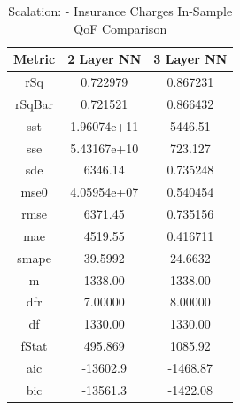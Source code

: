 \documentclass{article}
\begin{document}
\begin{table}[H]
\centering
\caption{Scalation: - Insurance Charges In-Sample QoF Comparison}
\label{tab:Scalation: - Insurance Charges In-Sample QoF Comparison}
\begin{tabular}{|c|c|c|} \hline 
Metric & 2 Layer NN & 3 Layer NN \\ \hline \hline 
rSq & 0.722979 & 0.867231 \\ \hline 
rSqBar & 0.721521 & 0.866432 \\ \hline 
sst & 1.96074e+11 & 5446.51 \\ \hline 
sse & 5.43167e+10 & 723.127 \\ \hline 
sde & 6346.14 & 0.735248 \\ \hline 
mse0 & 4.05954e+07 & 0.540454 \\ \hline 
rmse & 6371.45 & 0.735156 \\ \hline 
mae & 4519.55 & 0.416711 \\ \hline 
smape & 39.5992 & 24.6632 \\ \hline 
m & 1338.00 & 1338.00 \\ \hline 
dfr & 7.00000 & 8.00000 \\ \hline 
df & 1330.00 & 1330.00 \\ \hline 
fStat & 495.869 & 1085.92 \\ \hline 
aic & -13602.9 & -1468.87 \\ \hline 
bic & -13561.3 & -1422.08 \\ \hline 
\end{tabular}
\end{table}
\end{document}
